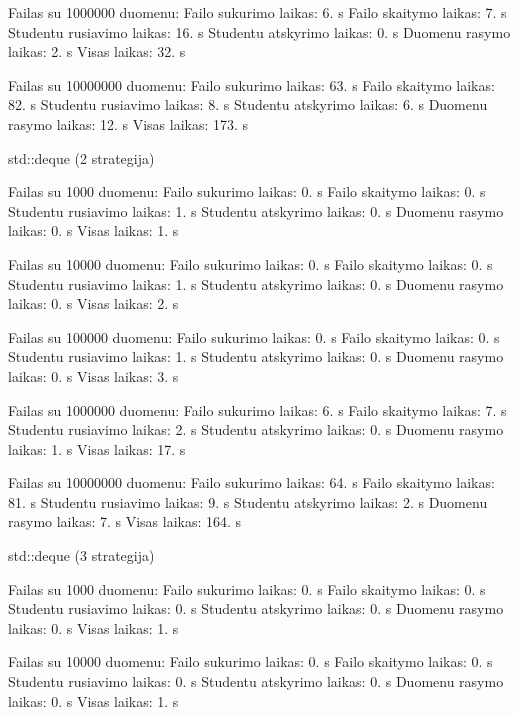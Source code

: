 Failas su 1000000 duomenu\+: Failo sukurimo laikas\+: 6. s Failo skaitymo laikas\+: 7. s Studentu rusiavimo laikas\+: 16. s Studentu atskyrimo laikas\+: 0. s Duomenu rasymo laikas\+: 2. s Visas laikas\+: 32. s

Failas su 10000000 duomenu\+: Failo sukurimo laikas\+: 63. s Failo skaitymo laikas\+: 82. s Studentu rusiavimo laikas\+: 8. s Studentu atskyrimo laikas\+: 6. s Duomenu rasymo laikas\+: 12. s Visas laikas\+: 173. s

std\+::deque (2 strategija)

Failas su 1000 duomenu\+: Failo sukurimo laikas\+: 0. s Failo skaitymo laikas\+: 0. s Studentu rusiavimo laikas\+: 1. s Studentu atskyrimo laikas\+: 0. s Duomenu rasymo laikas\+: 0. s Visas laikas\+: 1. s

Failas su 10000 duomenu\+: Failo sukurimo laikas\+: 0. s Failo skaitymo laikas\+: 0. s Studentu rusiavimo laikas\+: 1. s Studentu atskyrimo laikas\+: 0. s Duomenu rasymo laikas\+: 0. s Visas laikas\+: 2. s

Failas su 100000 duomenu\+: Failo sukurimo laikas\+: 0. s Failo skaitymo laikas\+: 0. s Studentu rusiavimo laikas\+: 1. s Studentu atskyrimo laikas\+: 0. s Duomenu rasymo laikas\+: 0. s Visas laikas\+: 3. s

Failas su 1000000 duomenu\+: Failo sukurimo laikas\+: 6. s Failo skaitymo laikas\+: 7. s Studentu rusiavimo laikas\+: 2. s Studentu atskyrimo laikas\+: 0. s Duomenu rasymo laikas\+: 1. s Visas laikas\+: 17. s

Failas su 10000000 duomenu\+: Failo sukurimo laikas\+: 64. s Failo skaitymo laikas\+: 81. s Studentu rusiavimo laikas\+: 9. s Studentu atskyrimo laikas\+: 2. s Duomenu rasymo laikas\+: 7. s Visas laikas\+: 164. s

std\+::deque (3 strategija)

Failas su 1000 duomenu\+: Failo sukurimo laikas\+: 0. s Failo skaitymo laikas\+: 0. s Studentu rusiavimo laikas\+: 0. s Studentu atskyrimo laikas\+: 0. s Duomenu rasymo laikas\+: 0. s Visas laikas\+: 1. s

Failas su 10000 duomenu\+: Failo sukurimo laikas\+: 0. s Failo skaitymo laikas\+: 0. s Studentu rusiavimo laikas\+: 0. s Studentu atskyrimo laikas\+: 0. s Duomenu rasymo laikas\+: 0. s Visas laikas\+: 1. s

